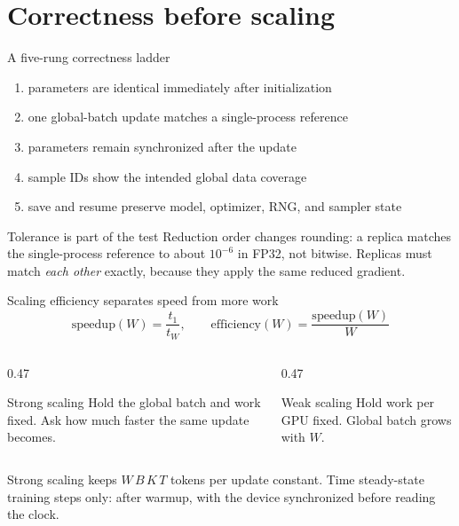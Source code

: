 \documentclass[handout]{beamer}
\begin{document}
\section{Correctness before scaling}

\begin{frame}{A five-rung correctness ladder}
  \begin{enumerate}
      \setlength{\itemsep}{5pt}
    \item parameters are identical immediately after initialization
    \item one global-batch update matches a single-process reference
    \item parameters remain synchronized after the update
    \item sample IDs show the intended global data coverage
    \item save and resume preserve model, optimizer, RNG, and sampler state
  \end{enumerate}
  \begin{alertblock}{Tolerance is part of the test}
    Reduction order changes rounding: a replica matches the single-process reference to about $10^{-6}$ in FP32, not bitwise. Replicas must match \emph{each other} exactly, because they apply the same reduced gradient.
  \end{alertblock}
\end{frame}

\begin{frame}{Scaling efficiency separates speed from more work}
  \[
    \text{speedup}(W)=\frac{t_1}{t_W},
    \qquad
    \text{efficiency}(W)=\frac{\text{speedup}(W)}{W}
  \]
  \begin{columns}[t]
    \begin{column}{0.47\linewidth}
      \begin{block}{Strong scaling}
        Hold the global batch and work fixed. Ask how much faster the same update becomes.
      \end{block}
    \end{column}
    \begin{column}{0.47\linewidth}
      \begin{block}{Weak scaling}
        Hold work per GPU fixed. Global batch grows with $W$.
      \end{block}
    \end{column}
  \end{columns}
  \vfill
  \small Strong scaling keeps $W\,B\,K\,T$ tokens per update constant. Time steady-state training steps only: after warmup, with the device synchronized before reading the clock.
\end{frame}
\end{document}
